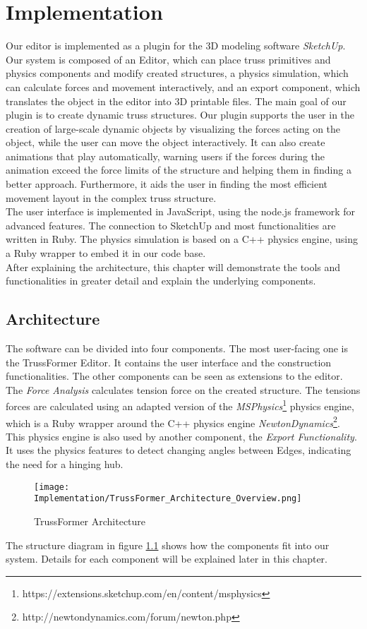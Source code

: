 \chapter{Implementation}\label{ch:implementation}
Our editor is implemented as a plugin for the 3D modeling software \textit{SketchUp}. Our system is composed of an Editor, which can place truss primitives and physics components and modify created structures, a physics simulation, which can calculate forces and movement interactively, and an export component, which translates the object in the editor into 3D printable files. The main goal of our plugin is to create dynamic truss structures. Our plugin supports the user in the creation of large-scale dynamic objects by visualizing the forces acting on the object, while the user can move the object interactively. It can also create animations that play automatically, warning users if the forces during the animation exceed the force limits of the structure and helping them in finding a better approach. Furthermore, it aids the user in finding the most efficient movement layout in the complex truss structure.\\
The user interface is implemented in JavaScript, using the node.js framework for advanced features. The connection to SketchUp and most functionalities are written in Ruby. The physics simulation is based on a C++ physics engine, using a Ruby wrapper to embed it in our code base.\\
After explaining the architecture, this chapter will demonstrate the tools and functionalities in greater detail and explain the underlying components.

\section{Architecture}
The software can be divided into four components. The most user-facing one is the TrussFormer Editor. It contains the user interface and the construction functionalities. The other components can be seen as extensions to the editor. The \textit{Force Analysis} calculates tension force on the created structure. The tensions forces are calculated using an adapted version of the \textit{MSPhysics}\footnote{https://extensions.sketchup.com/en/content/msphysics} physics engine, which is a Ruby wrapper around the C++ physics engine \textit{NewtonDynamics}\footnote{http://newtondynamics.com/forum/newton.php}.\\
This physics engine is also used by another component, the \textit{Export Functionality}. It uses the physics features to detect changing angles between Edges, indicating the need for a hinging hub.
\begin{figure}[!h]
    \texttt{[image: Implementation/TrussFormer\_Architecture\_Overview.png]}
    \centering
    \caption{TrussFormer Architecture}
    \label{fig:architecture}
\end{figure}
The structure diagram in figure \ref{fig:architecture} shows how the components fit into our system. Details for each component will be explained later in this chapter.

